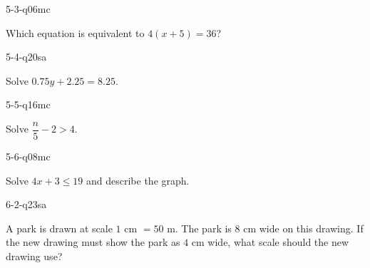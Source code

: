 \begin{practiceQuestion}{5-3-q06}{mc}
\begin{questionText}
Which equation is equivalent to $4(x + 5) = 36$?
\end{questionText}
\end{practiceQuestion}

\begin{practiceQuestion}{5-4-q20}{sa}
\begin{questionText}
Solve $0.75y + 2.25 = 8.25$.
\end{questionText}
\end{practiceQuestion}

\begin{practiceQuestion}{5-5-q16}{mc}
\begin{questionText}
Solve $\dfrac{n}{5} - 2 > 4$.
\end{questionText}
\end{practiceQuestion}

\begin{practiceQuestion}{5-6-q08}{mc}
\begin{questionText}
Solve $4x + 3 \leq 19$ and describe the graph.
\end{questionText}
\end{practiceQuestion}

\begin{practiceQuestion}{6-2-q23}{sa}
\begin{questionText}
A park is drawn at scale $1$ cm $= 50$ m. The park is $8$ cm wide on this drawing. If the new drawing must show the park as $4$ cm wide, what scale should the new drawing use?
\end{questionText}
\end{practiceQuestion}

